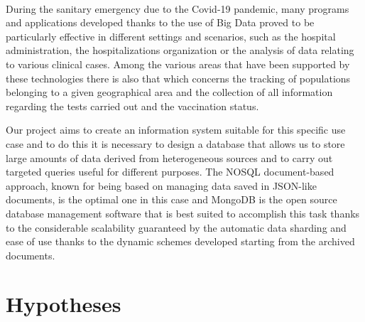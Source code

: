 \documentclass[a4paper,12pt]{article}
\begin{document}
\paragraph{}During the sanitary emergency due to the Covid-19 pandemic, many programs and applications developed thanks to the use of Big Data proved to be particularly effective in different settings and scenarios, such as the hospital administration, the hospitalizations organization or the analysis of data relating to various clinical cases. Among the various areas that have been supported by these technologies there is also that which concerns the tracking of populations belonging to a given geographical area and the collection of all information regarding the tests carried out and the vaccination status. \par
Our project aims to create an information system suitable for this specific use case and to do this it is necessary to design a database that allows us to store large amounts of data derived from heterogeneous sources and to carry out targeted queries useful for different purposes. The NOSQL document-based approach, known for being based on managing data saved in JSON-like documents, is the optimal one in this case and MongoDB is the open source database management software that is best suited to accomplish this task thanks to the considerable scalability guaranteed by the automatic data sharding and ease of use thanks to the dynamic schemes developed starting from the archived documents.
\section{Hypotheses}
\end{document}
